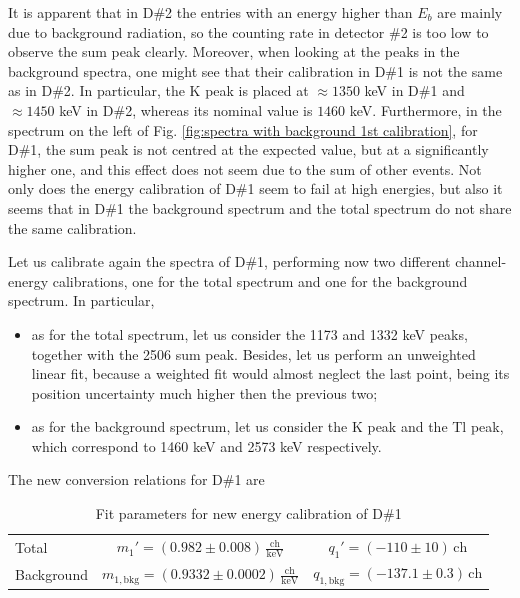 \documentclass[a4paper]{article}
\begin{document}
It is apparent that in D\#2 the entries with an energy higher than $E_b$ are mainly due to background radiation, so the counting rate in detector \#2 is too low to observe the sum peak clearly. 
Moreover, when looking at the peaks in the background spectra, one might see that their calibration in D\#1 is not the same as in D\#2. In particular, the K peak is placed at $\approx\!1350$ keV in D\#1 and $\approx\!1450$ keV in D\#2, whereas its nominal value is $1460$ keV. Furthermore, in the spectrum on the left of Fig. \ref{fig:spectra with background 1st calibration}, for D\#1, the sum peak is not centred at the expected value, but at a significantly higher one, and this effect does not seem due to the sum of other events. Not only does the energy calibration of D\#1 seem to fail at high energies, but also it seems that in D\#1 the background spectrum and the total spectrum do not share the same calibration. 

Let us calibrate again the spectra of D\#1, performing now two different channel-energy calibrations, one for the total spectrum and one for the background spectrum. In particular,

\begin{itemize}
    \item[-] as for the total spectrum, let us consider the 1173 and 1332 keV peaks, together with the 2506 sum peak. Besides, let us perform an unweighted linear fit, because a weighted fit would almost neglect the last point, being its position uncertainty much higher then the previous two;
    \item[-] as for the background spectrum, let us consider the K peak and the  Tl peak, which correspond to 1460 keV and 2573 keV respectively.
\end{itemize}
The new conversion relations for D\#1 are 

\begin{table}[H]
    \centering
    \begin{tabular}{|l|cc|}
    \hline
     Total & $m_1'=(0.982\pm0.008)\,\frac{\mathrm{ch}}{\mathrm{keV}}$ &  $q_1'=(-110\pm10) \,\mathrm{ch}$\\
     Background & $m_{1,\mathrm{bkg}}=(0.9332\pm0.0002)\,\frac{\mathrm{ch}}{\mathrm{keV}}$ & $q_{1,\mathrm{bkg}}=(-137.1\pm0.3)\,\mathrm{ch}$\\ 
    \hline        
    \end{tabular}
    \caption{Fit parameters for new energy calibration of D\#1}%
    \label{tab:cal_fit_new}
\end{table}
\end{document}
